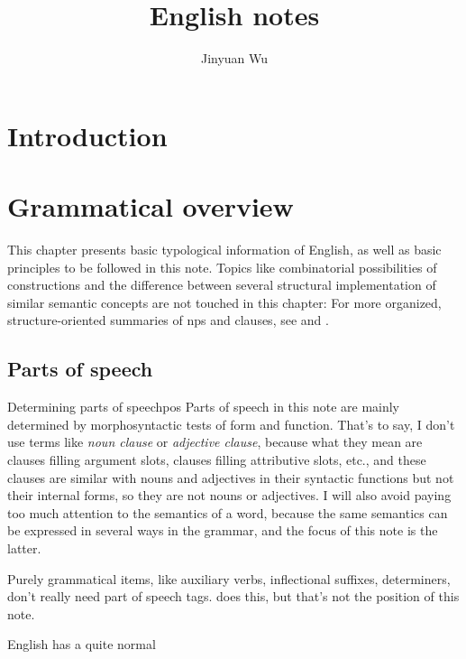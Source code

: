 \documentclass[UTF8, a4paper, oneside, scheme=plain]{ctexrep}
\title{English notes}
\author{Jinyuan Wu}
\newcommand*{\term}[1]{\emph{#1}}
\begin{document}
    
\maketitle

\automath

\chapter{Introduction}

\chapter{Grammatical overview}

This chapter presents basic typological information of English,
as well as basic principles to be followed in this note.
Topics like combinatorial possibilities of constructions
and the difference between several structural implementation of 
similar semantic concepts are not touched in this chapter:
For more organized, structure-oriented summaries of 
\acs{np}s and clauses, 
see  and .

\section{Parts of speech}

\begin{theorybox}{Determining parts of speech}{pos}
    Parts of speech in this note are mainly determined 
    by morphosyntactic tests of form and function.
    That's to say, I don't use terms like \term{noun clause} or \term{adjective clause},
    because what they mean are clauses filling argument slots, 
    clauses filling attributive slots, etc.,
    and these clauses are similar with nouns and adjectives in their syntactic functions 
    but not their internal forms,
    so they are not nouns or adjectives.
    I will also avoid paying too much attention to the semantics of a word,
    because the same semantics can be expressed in several ways in the grammar,
    and the focus of this note is the latter.

    Purely grammatical items, like auxiliary verbs, inflectional suffixes, determiners,
    don't really need part of speech tags.
    \citet{cgel} does this,
    but that's not the position of this note.
\end{theorybox}

English has a quite normal 
\end{document}
